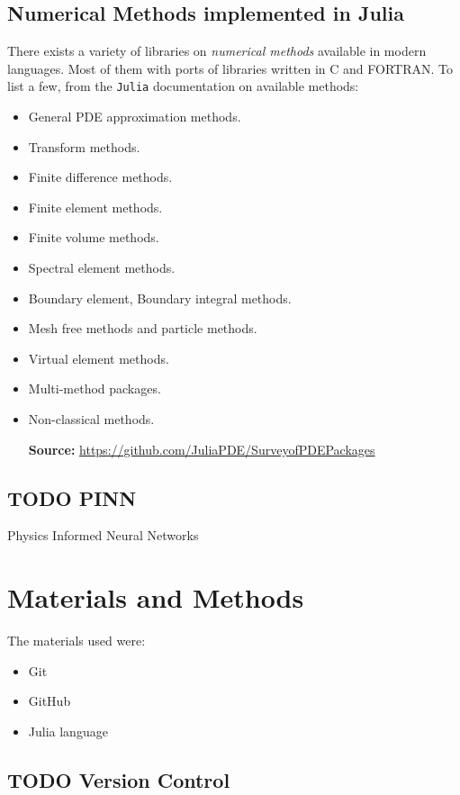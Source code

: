 \documentclass[12pt]{article}
\begin{document}
\subsection{Numerical Methods implemented in Julia}
\label{sec:org06a2eb4}
\label{sec:num-julia}

There exists a variety of libraries on \emph{numerical methods}
available in modern languages. Most of them with ports of libraries
written in C and FORTRAN. To list a few, from the \texttt{Julia}
documentation on available methods:

\begin{itemize}
\item General PDE approximation methods.
\item Transform methods.
\item Finite difference methods.
\item Finite element methods.
\item Finite volume methods.
\item Spectral element methods.
\item Boundary element, Boundary integral methods.
\item Mesh free methods and particle methods.
\item Virtual element methods.
\item Multi-method packages.
\item Non-classical methods.

\textbf{Source:} \url{https://github.com/JuliaPDE/SurveyofPDEPackages}
\end{itemize}
\subsection{{\bfseries\sffamily TODO} PINN}
\label{sec:org8c9ff59}

Physics Informed Neural Networks

\section{Materials and Methods}
\label{sec:org6920671}

The materials used were:
\begin{itemize}
\item Git
\item GitHub
\item Julia language
\end{itemize}

\subsection{{\bfseries\sffamily TODO} Version Control}
\label{sec:org690609a}
\end{document}
